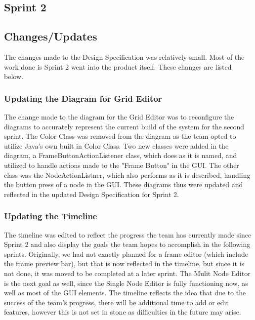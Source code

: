 \documentclass[12pt]{article}
\begin{document}
\begin{appendices}
  \section{Sprint 2}
    \subsection{Changes/Updates}
    The changes made to the Design Specification was relatively small. Most of the work done is Sprint 2 went into the product itself. These changes are listed below.
    
      \subsubsection{Updating the Diagram for Grid Editor}
        The change made to the diagram for the Grid Editor was to reconfigure the diagrams to accurately represent the current build of the system for the second sprint. The Color Class was removed from the diagram as the team opted to utilize Java's own built in Color Class. Two new classes were added in the diagram, a FrameButtonActionListener class, which does as it is named, and utilized to handle actions made to the "Frame Button" in the GUI. The other class was the NodeActionListner, which also performs as it is described, handling the button press of a node in the GUI. These diagrams thus were updated and reflected in the updated Design Specification for Sprint 2.
    
      \subsubsection {Updating the Timeline}
        The timeline was edited to reflect the progress the team has currently made since Sprint 2 and also display the goals the team hopes to accomplish in the following sprints. Originally, we had not exactly planned for a frame editor (which include the frame preview bar), but that is now reflected in the timeline, but since it is not done, it was moved to be completed at a later sprint. The Mulit Node Editor is the next goal as well, since the Single Node Editor is fully functioning now, as well as most  of the GUI elements. The timeline reflects the idea that due to the success of the team's progress, there will be additional time to add or edit features, however this is not set in stone as difficulties in the future may arise.


\end{appendices}
\end{document}
